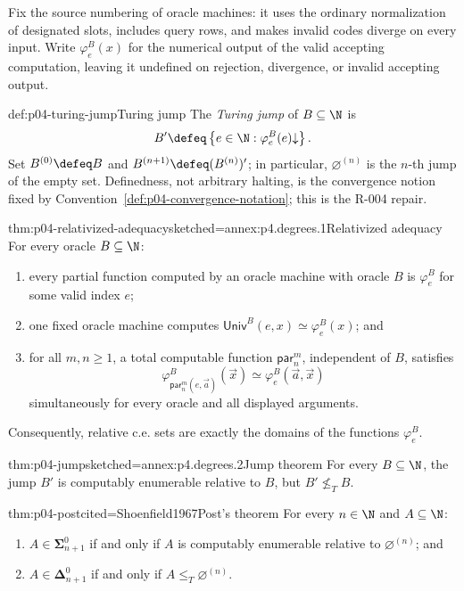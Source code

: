 Fix the source numbering of oracle machines: it uses the ordinary
normalization of designated slots, includes query rows, and makes invalid
codes diverge on every input.  Write \(\varphi^B_e(x)\) for the numerical output of
the valid accepting computation, leaving it undefined on rejection,
divergence, or invalid accepting output.

\begin{hbdefinition}{def:p04-turing-jump}{Turing jump}
The \emph{Turing jump} of \(B\subseteq\N\) is
\[
 B'\defeq\left\{e\in\N:\varphi^B_e(e)\mathord\downarrow\right\}.
\]
Set \(B^{(0)}\defeq B\) and \(B^{(n+1)}\defeq(B^{(n)})'\); in particular,
\(\varnothing^{(n)}\) is the \(n\)-th jump of the empty set.  Definedness,
not arbitrary halting, is the convergence notion fixed by
Convention~\ref{def:p04-convergence-notation}; this is the R-004 repair.
\end{hbdefinition}

\begin{hblemma}{thm:p04-relativized-adequacy}{sketched=annex:p4.degrees.1}{Relativized adequacy}
For every oracle \(B\subseteq\N\):
\begin{enumerate}
 \item every partial function computed by an oracle machine with oracle \(B\)
       is \(\varphi^B_e\) for some valid index \(e\);
 \item one fixed oracle machine computes
       \(\mathsf{Univ}^B(e,x)\simeq\varphi^B_e(x)\); and
 \item for all \(m,n\geq1\), a total computable function
       \(\mathsf{par}_n^m\), independent of \(B\), satisfies
       \[
        \varphi^B_{\mathsf{par}_n^m(e,\vec a)}(\vec x)
        \simeq\varphi^B_e(\vec a,\vec x)
       \]
       simultaneously for every oracle and all displayed arguments.
\end{enumerate}
\end{hblemma}

Consequently, relative c.e. sets are exactly the domains of the functions
\(\varphi^B_e\).

\begin{hbtheorem}{thm:p04-jump}{sketched=annex:p4.degrees.2}{Jump theorem}
For every \(B\subseteq\N\), the jump \(B'\) is computably enumerable
relative to \(B\), but \(B'\not\leq_TB\).
\end{hbtheorem}

\begin{hbtheorem}{thm:p04-post}{cited=Shoenfield1967}{Post's theorem}
For every \(n\in\N\) and \(A\subseteq\N\):
\begin{enumerate}
 \item \(A\in\boldsymbol\Sigma^0_{n+1}\) if and only if \(A\) is
       computably enumerable relative to \(\varnothing^{(n)}\); and
 \item \(A\in\boldsymbol\Delta^0_{n+1}\) if and only if
       \(A\leq_T\varnothing^{(n)}\).
\end{enumerate}
\end{hbtheorem}

